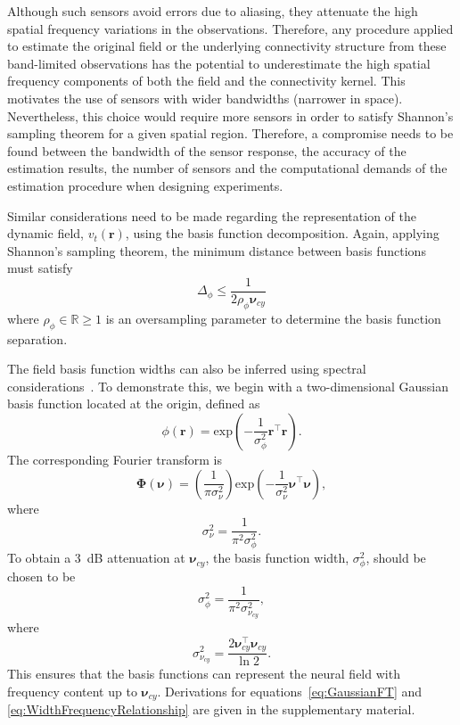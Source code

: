 \documentclass[12pt]{iopart}
\begin{document}
Although such sensors avoid errors due to aliasing, they attenuate the high spatial frequency variations in the observations. Therefore, any procedure applied to estimate the original field or the underlying connectivity structure from these band-limited observations has the potential to underestimate the high spatial frequency components of both the field and the connectivity kernel. This motivates the use of sensors with wider bandwidths (narrower in space). Nevertheless, this choice would require more sensors in order to satisfy Shannon's sampling theorem for a given spatial region. Therefore, a compromise needs to be found between the bandwidth of the sensor response, the accuracy of the estimation results, the number of sensors and the computational demands of the estimation procedure when designing experiments.

Similar considerations need to be made regarding the representation of the dynamic field, $v_t(\mathbf{r})$, using the basis function decomposition. Again, applying Shannon's sampling theorem, the minimum distance between basis functions must satisfy 
\begin{equation}\label{eq:BasisFunctionSeparation}
	\Delta_{\phi} \leq \frac{1}{2\rho_{\phi}\boldsymbol{\nu}_{cy}}
\end{equation}
where $\rho_{\phi} \in \mathbb{R} \ge 1$ is an oversampling parameter to determine the basis function separation. 

The field basis function widths can also be inferred using spectral considerations~\cite{Sanner1992,Scerri2009}. To demonstrate this, we begin with a two-dimensional Gaussian basis function located at the origin, defined as
\begin{equation}\label{eq:BasisFunctionAtOrigin}
 \phi(\mathbf r)=\mathrm{exp}\left({-\frac{1}{\sigma_{\phi}^2} \mathbf r^\top\mathbf r}\right).
\end{equation}
The corresponding Fourier transform is
\begin{equation}\label{eq:GaussianFT}
\boldsymbol\Phi(\boldsymbol \nu)=\left(\frac{1}{\pi\sigma_{\nu}^2}\right)\mathrm{exp}\left(-\frac{1}{\sigma_{\nu}^2}\boldsymbol\nu^\top \boldsymbol\nu\right),
\end{equation}
where 
\begin{equation}\label{eq:GaussianFTWidth}
	\sigma^2_{\nu} = \frac{1}{\pi^2\sigma_{\phi}^2}. 
\end{equation}
To obtain a 3~dB attenuation at $\boldsymbol\nu_{cy}$, the basis function width, $\sigma^2_{\phi}$, should be chosen to be
\begin{equation}\label{eq:WidthCutOffRelationship}
 \sigma^2_{\phi}= \frac{1}{\pi^2\sigma_{\nu_{cy}}^2},
\end{equation}
where
\begin{equation}\label{eq:WidthFrequencyRelationship}
 \sigma^2_{\nu_{cy}}= \frac{2\boldsymbol\nu_{cy}^\top \boldsymbol\nu_{cy}}{\ln2}.
\end{equation}
This ensures that the basis functions can represent the neural field with frequency content up to $\boldsymbol\nu_{cy}$. Derivations for equations~\ref{eq:GaussianFT} and \ref{eq:WidthFrequencyRelationship} are given in the supplementary material.
\end{document}
